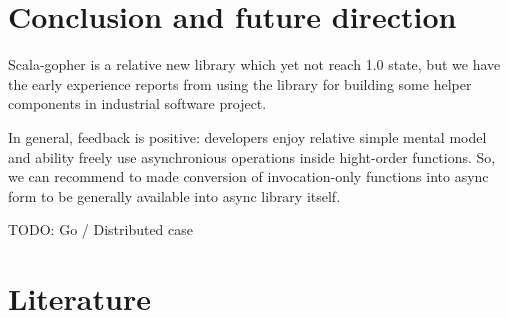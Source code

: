 \documentclass[12pt]{article}
\begin{document}
  
\section{ Conclusion and future direction }
  
  Scala-gopher is a relative new library which yet not reach 1.0 state, but we have the early experience
 reports from using the library for building some helper components in industrial software project. 

 In general, feedback is positive: developers enjoy relative simple mental model and ability freely use asynchronious operations inside hight-order functions.  So, we can recommend to made conversion of invocation-only functions into async form to be generally available into async library itself. 

 
 
  TODO:  Go /  Distributed case

\section{Literature}

\printbibliography
\end{document}
